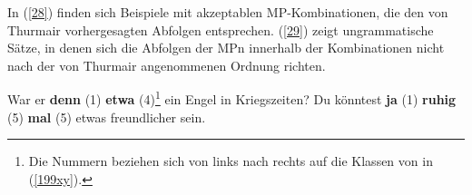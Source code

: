\noindent	
In (\ref{28}) finden sich Beispiele mit akzeptablen MP-Kom\-bi\-na\-ti\-on\-en, die den von Thurmair vorhergesagten Abfolgen entsprechen. (\ref{29}) zeigt ungrammatische Sätze, in denen sich die Abfolgen der MPn innerhalb der Kombinationen nicht nach der von Thurmair angenommenen Ordnung richten.

\begin{exe}
	\ex\label{28} 
		\begin{xlist}	
			\ex\label{28a} War er \textbf{denn} (1) \textbf{etwa} (4)\footnote{Die Nummern beziehen sich von links nach rechts auf die Klassen von \citet{Thurmair1991} in (\ref{199xy}).} ein Engel in Kriegszeiten?
			\ex\label{28b} Du könntest \textbf{ja} (1) \textbf{ruhig} (5) \textbf{mal} (5) etwas freundlicher sein.
		\end{xlist}
\end{exe}

